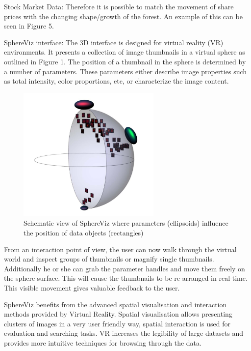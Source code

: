 Stock Market Data: Therefore it is possible to match the movement of share prices with the changing shape/growth of the forest. An example of this can be seen in Figure 5.
\cite{Jamieson2007}

SphereViz interface: The 3D interface is designed for virtual reality (VR) environments. It presents a collection of image thumbnails in a virtual sphere as outlined in Figure 1. The position of a thumbnail in the sphere is determined by a number of parameters. These parameters either describe image properties such as total intensity, color proportions, etc, or characterize the image content.
\cite{Soldati2007}

\begin{figure}[h]
	\begin{center}
		\includegraphics[width=7cm]{03_Figures/05_LitReview/Soldati2007_SphereViz.png}
		\caption[Schematic view of SphereViz where parameters influence the position of data objects]{Schematic view of SphereViz where parameters (ellipsoids) influence the position of data objects (rectangles) \citep{Soldati2007}}
		\label{fig:sphereviz}
	\end{center}
\end{figure} 

From an interaction point of view, the user can now walk through the virtual world and inspect groups of
thumbnails or magnify single thumbnails. Additionally he or she can grab the parameter handles and move them freely on the sphere surface. This will cause the thumbnails to be re-arranged in real-time. This visible movement gives valuable feedback to the user.
\cite{Soldati2007}

SphereViz benefits from the advanced spatial visualisation and interaction methods provided by Virtual Reality. Spatial visualisation allows presenting clusters of images in a very user friendly way, spatial interaction is used for evaluation and searching tasks. VR increases the legibility of large datasets and provides more intuitive techniques for browsing through the data.
\cite{Soldati2007}

